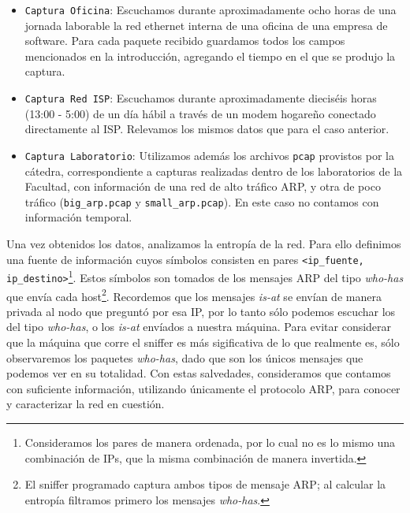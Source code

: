 \begin{itemize}
 \item \texttt{Captura Oficina}: Escuchamos durante aproximadamente ocho horas de una jornada laborable la red ethernet interna de una oficina de una empresa de software. Para cada paquete recibido guardamos todos los campos mencionados en la introducci\'on, agregando el tiempo en el que se produjo la captura.
 
 \item \texttt{Captura Red ISP}: Escuchamos durante aproximadamente dieciséis horas (13:00 - 5:00) de un día hábil a través de un modem hogareño conectado directamente al ISP. Relevamos los mismos datos que para el caso anterior.

 \item \texttt{Captura Laboratorio}: Utilizamos adem\'as los archivos \texttt{pcap} provistos por la c\'atedra, correspondiente a capturas realizadas dentro de los laboratorios de la Facultad, con informaci\'on de una red de alto tr\'afico ARP, y otra de poco tr\'afico (\texttt{big\_arp.pcap} y \texttt{small\_arp.pcap}). En este caso no contamos con información temporal.\\

\end{itemize}

Una vez obtenidos los datos, analizamos la entrop\'ia de la red. Para ello definimos una fuente de informaci\'on cuyos s\'imbolos consisten en pares \texttt{<ip\_fuente, ip\_destino>}\footnote{Consideramos los pares de manera ordenada, por lo cual no es lo mismo una combinaci\'on de IPs, que la misma combinaci\'on de manera invertida.}. Estos s\'imbolos son tomados de los mensajes ARP del tipo \emph{who-has} que env\'ia cada host\footnote{El sniffer programado captura ambos tipos de mensaje ARP; al calcular la entrop\'ia filtramos primero los mensajes \emph{who-has}.}. Recordemos que los mensajes \emph{is-at} se env\'ian de manera privada al nodo que pregunt\'o por esa IP, por lo tanto s\'olo podemos escuchar los del tipo \emph{who-has}, o los \emph{is-at} env\'iados a nuestra m\'aquina. Para evitar considerar que la m\'aquina que corre el sniffer es m\'as sigificativa de lo que realmente es, s\'olo observaremos los paquetes \emph{who-has}, dado que son los únicos mensajes que podemos ver en su totalidad. Con estas salvedades, consideramos que contamos con suficiente información, utilizando únicamente el protocolo ARP, para conocer y caracterizar la red en cuestión. \\

